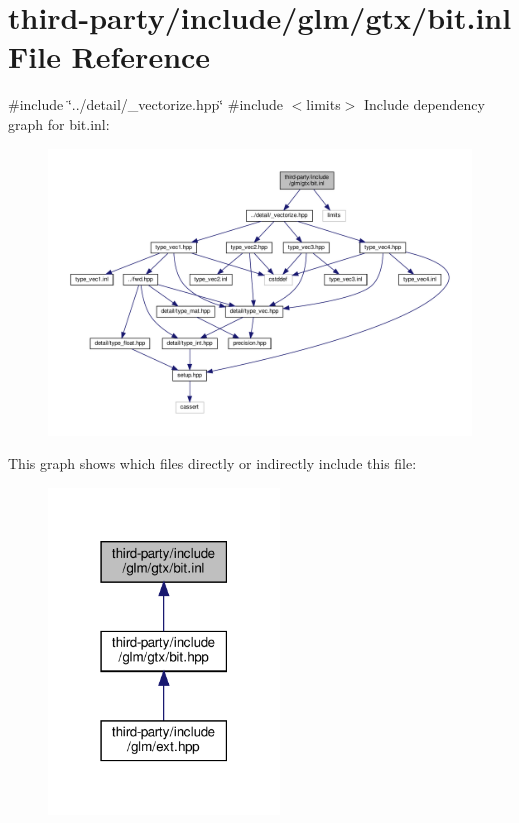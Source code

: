 \hypertarget{bit_8inl}{}\section{third-\/party/include/glm/gtx/bit.inl File Reference}
\label{bit_8inl}
{\ttfamily \#include \char`\"{}../detail/\+\_\+vectorize.\+hpp\char`\"{}}\newline
{\ttfamily \#include $<$limits$>$}\newline
Include dependency graph for bit.\+inl\+:
\nopagebreak
\begin{figure}[H]
\begin{center}
\leavevmode
\includegraphics[width=350pt]{bit_8inl__incl}
\end{center}
\end{figure}
This graph shows which files directly or indirectly include this file\+:
\nopagebreak
\begin{figure}[H]
\begin{center}
\leavevmode
\includegraphics[width=174pt]{bit_8inl__dep__incl}
\end{center}
\end{figure}
